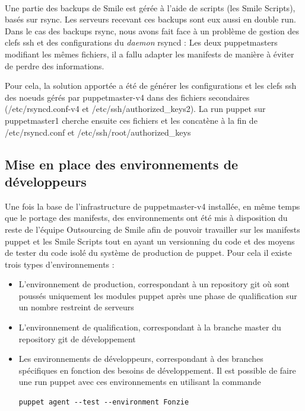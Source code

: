 \documentclass[14 pt]{extreport}
\begin{document}
\paragraph*{}Une partie des backups de Smile est gérée à l'aide de scripts (les Smile Scripts), basés sur rsync. Les serveurs recevant ces backups sont eux aussi en double run. Dans le cas des backups rsync, nous avons fait face à un problème de gestion des clefs ssh et des configurations du \emph{daemon} rsyncd : Les deux puppetmasters modifiant les mêmes fichiers, il a fallu adapter les manifests de manière à éviter de perdre des informations.

Pour cela, la solution apportée a été de générer les configurations et les clefs ssh des noeuds gérés par puppetmaster-v4 dans des fichiers secondaires (/etc/rsyncd.conf-v4 et /etc/ssh/authorized\_keys2). La run puppet sur puppetmaster1 cherche ensuite ces fichiers et les concatène à la fin de /etc/rsyncd.conf et /etc/ssh/root/authorized\_keys

\subsection{Mise en place des environnements de développeurs}

Une fois la base de l'infrastructure de puppetmaster-v4 installée, en même temps que le portage des manifests, des environnements ont été mis à disposition du reste de l'équipe Outsourcing de Smile afin de pouvoir travailler sur les manifests puppet et les Smile Scripts tout en ayant un versionning du code et des moyens de tester du code isolé du système de production de puppet. Pour cela il existe trois types d'environnements :
\begin{itemize}
	\item L'environnement de production, correspondant à un repository git où sont poussés uniquement les modules puppet après une phase de qualification sur un nombre restreint de serveurs
	\item L'environnement de qualification, correspondant à la branche master du repository git de développement
	\item Les environnements de développeurs, correspondant à des branches spécifiques en fonction des besoins de développement. Il est possible de faire une run puppet avec ces environnements en utilisant la commande \begin{verbatim}puppet agent --test --environment Fonzie\end{verbatim}
\end{itemize}
\end{document}
